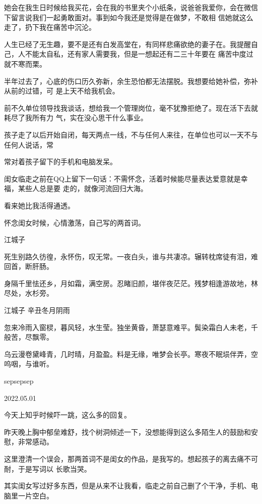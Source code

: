 \documentclass{article}
\begin{document}
\newpage

她会在我生日时候给我买花，会在我的书里夹个小纸条，说爸爸我爱你，会在微信下留言说我们一起勇敢面对。事到如今我还是觉得是在做梦，不敢相
信她就这么走了，扔下我在痛苦中沉沦。 

人生已经了无生趣，要不是还有白发高堂在，有同样悲痛欲绝的妻子在。我提醒自己，人不能太自私，还有家人需要我，但是一想起还有二三十年要在
痛苦中度过就不寒而栗。 

半年过去了，心底的伤口历久弥新，余生恐怕都无法摆脱。我想要给她补偿，弥补从前的过错，可
是上天不给我机会。 

前不久单位领导找我谈话，想给我一个管理岗位，毫不犹豫拒绝了。现在活下去就耗尽了我所有力
气，实在没心思干什么事业。 

孩子走了以后开始自闭，每天两点一线，不与任何人来往，在单位也可以一天不与任何人说话，常

\newpage
常对着孩子留下的手机和电脑发呆。 

闺女临走之前在QQ上留下一句话：不需怀念，活着时候能尽量表达爱意就是幸福，某些人总是要
走的，就像河流回归大海。 


看来她比我活得通透。 

怀念闺女时候，心情激荡，自己写的两首词。


江城子 

死生别路久彷徨，永怀伤，叹无常。一夜白头，谁与共凄凉。辗转枕席徒有泪，难回首，断肝肠。

身隔千里怯还乡，月如霜，满空房。忍睹旧颜，堪伴夜茫茫。残梦相逢游故地，林尽处，水杉旁。


 


江城子 辛丑冬月阴雨 

\newpage

忽来冷雨入窗棂，暮风轻，水生莹。独坐黄昏，萧瑟意难平。鬓染霜白人未老，千般苦，尽飘零。

乌云漫卷黛峰青，几时晴，月盈盈。料是无缘，唯梦会长亭。寒夜不眠埙伴弄，空呜咽，与谁听。


sepsepsep 


2022.05.01 


今天上知乎时候吓一跳，这么多的回复。 

昨天晚上胸中郁垒难舒，找个树洞倾述一下，没想能得到这么多陌生人的鼓励和安慰，非常感动。

这里澄清一个误会，那两首词不是闺女的作品，是我写的。想起孩子的离去痛不可耐，于是写词以
长歌当哭。 

其实闺女写过好多东西，但是从来不让我看，临走之前自己删了个干净，手机、电脑里一片空白。
\newpage
\end{document}
